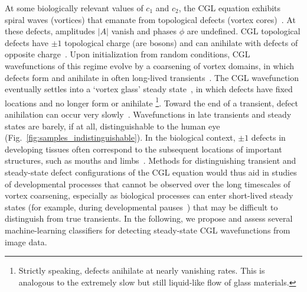\documentclass[nofootinbib,pre,superscriptaddress,twocolumn,longbibliography,floatfix]{revtex4-2}
\begin{document}
At some biologically relevant values of $c_1$ and $c_2$,
the CGL equation exhibits spiral waves (vortices) that emanate from topological defects (vortex cores)~\cite{tan2020topological}.
At these defects, amplitudes $|A|$ vanish and phases $\phi$ are undefined.
CGL topological defects have $\pm 1$ topological charge (are bosons)
and can anihilate with defects of opposite charge~\cite{liu2021topological}.
Upon initialization from random conditions,
CGL wavefunctions of this regime evolve by a coarsening of vortex domains,
in which defects form and anihilate in often long-lived transients~\cite{chate1996phase}.
The CGL wavefunction eventually settles into a `vortex glass' steady state~\cite{huber1992nucleation},
in which defects have fixed locations and no longer form or anihilate
\footnote{Strictly speaking, defects anihilate at nearly vanishing rates.
This is analogous to the extremely slow but still liquid-like flow of glass materials.}.
Toward the end of a transient, defect anihilation can occur very slowly~\cite{liu2021topological}.
Wavefunctions in late transients and steady states are barely, if at all, distinguishable to the human eye (Fig.~\ref{fig:samples_indistinguishable}).
In the biological context, $\pm 1$ defects in developing tissues often correspond to the subsequent locations of important structures,
such as mouths and limbs~\cite{guillamat2022integer}.
Methods for distinguishing transient and steady-state defect configurations of the CGL equation
would thus aid in studies of developmental processes that cannot be observed over the long timescales of vortex coarsening,
especially as biological processes can enter short-lived steady states (for example, during developmental pauses~\cite{vanglist2020time}) that may be difficult to distinguish from true transients.
In the following, we propose and assess several machine-learning classifiers for detecting steady-state CGL wavefunctions from image data. 
\end{document}
